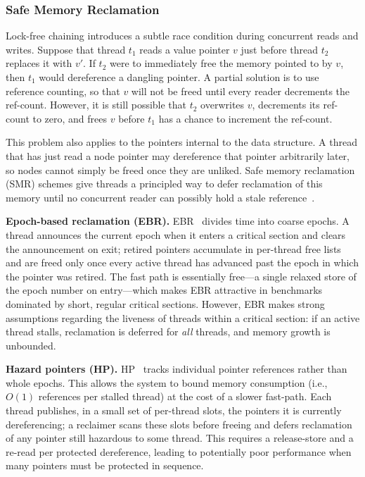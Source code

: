 \subsubsection{Safe Memory Reclamation}
Lock-free chaining introduces a subtle race condition during concurrent reads
and writes. Suppose that thread $t_{1}$ reads a value pointer $v$ just before
thread $t_{2}$ replaces it with $v'$. If $t_{2}$ were to immediately free the
memory pointed to by $v$, then $t_{1}$ would dereference a dangling pointer. A
partial solution is to use reference counting, so that $v$ will not be freed
until every reader decrements the ref-count. However, it is still possible that
$t_{2}$ overwrites $v$, decrements its ref-count to zero, and frees $v$ before
$t_{1}$ has a chance to increment the ref-count.

This problem also applies to the pointers internal to the data structure. A
thread that has just read a node pointer may dereference that pointer
arbitrarily later, so nodes cannot simply be freed once they are unliked. Safe
memory reclamation (SMR) schemes give threads a principled way to defer
reclamation of this memory until no concurrent reader can possibly hold a stale
reference~\cite{michael04hazard, hart07performance}.

\textbf{Epoch-based reclamation (EBR).} EBR~\cite{fraser04thesis} divides time
into coarse epochs. A thread announces the current epoch when it enters a
critical section and clears the announcement on exit; retired pointers
accumulate in per-thread free lists and are freed only once every active thread
has advanced past the epoch in which the pointer was retired. The fast path is
essentially free---a single relaxed store of the epoch number on entry---which
makes EBR attractive in benchmarks dominated by short, regular critical
sections. However, EBR makes strong assumptions regarding the liveness of
threads within a critical section: if an active thread stalls, reclamation is
deferred for \emph{all} threads, and memory growth is unbounded.

\textbf{Hazard pointers (HP).} HP~\cite{michael04hazard} tracks individual
pointer references rather than whole epochs. This allows the system to bound
memory consumption (i.e., $O(1)$ references per stalled thread) at the cost of a
slower fast-path. Each thread publishes, in a small set of per-thread slots, the
pointers it is currently dereferencing; a reclaimer scans these slots before
freeing and defers reclamation of any pointer still hazardous to some thread.
This requires a release-store and a re-read per protected dereference, leading
to potentially poor performance when many pointers must be protected in
sequence.

